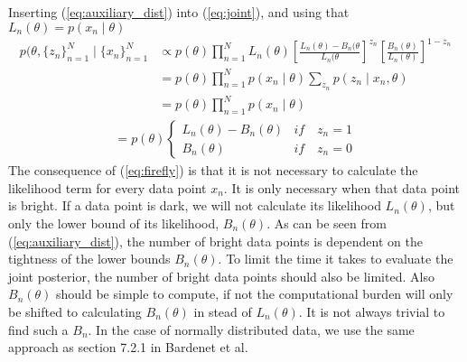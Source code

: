 \documentclass{article}
\theoremstyle{definition}
\begin{document}
Inserting (\ref{eq:auxiliary_dist}) into (\ref{eq:joint}), and using that $L_n(\theta) = p(x_n\mid\theta)$
\begin{equation}
\begin{split}
     p(\theta, \{z_n\}_{n=1}^N\mid\{x_n\}_{n=1}^N &\propto p(\theta) \prod_{n=1}^N L_n(\theta)\left[\frac{L_n(\theta) - B_n(\theta}{L_n(\theta}\right]^{z_n}\left[\frac{B_n(\theta)}{L_n(\theta)}\right]^{1-z_n} \\
     &= p(\theta) \prod_{n=1}^N p\left(x_n\mid\theta\right)\sum_{z_n} p\left(z_n\mid x_n, \theta\right)
     \\
     &= p(\theta) \prod_{n=1}^N p\left(x_n\mid\theta\right)
\end{split}
\end{equation}
\begin{equation}
\label{eq:firefly}
\begin{split}
     =p(\theta)
     \begin{cases}
        L_n(\theta) - B_n(\theta) & if \quad z_n = 1 \\
        B_n(\theta) & if \quad z_n = 0
     \end{cases}
\end{split}
\end{equation}
The consequence of (\ref{eq:firefly}) is that it is not necessary to calculate the likelihood term for every data point $x_n$. It is only necessary when that data point is bright. If a data point is dark, we will not calculate its likelihood $L_n(\theta)$, but only the lower bound of its likelihood, $B_n(\theta)$. 
As can be seen from (\ref{eq:auxiliary_dist}), the number of bright data points is dependent on the tightness of the lower bounds $B_n(\theta)$. To limit the time it takes to evaluate the joint posterior, the number of bright data points should also be limited. Also $B_n(\theta)$ should be simple to compute, if not the computational burden will only be shifted to calculating $B_n(\theta)$ in stead of $L_n(\theta)$. 
It is not always trivial to find such a $B_n$. In the case of normally distributed data, we use the same approach as section 7.2.1 in Bardenet et al.
\end{document}

